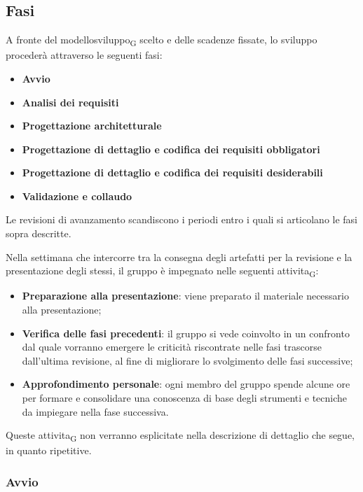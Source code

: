 \subsection{Fasi}

A fronte del \gls{modellosviluppo}\textsubscript{G} scelto e delle scadenze fissate, lo sviluppo procederà attraverso le seguenti fasi:
\begin{itemize}
	\item \textbf{Avvio}
	\item \textbf{Analisi dei requisiti}
	\item \textbf{Progettazione architetturale}
	\item \textbf{Progettazione di dettaglio e codifica dei requisiti obbligatori}
	\item \textbf{Progettazione di dettaglio e codifica dei requisiti desiderabili}
	\item \textbf{Validazione e collaudo}
\end{itemize}

Le revisioni di avanzamento scandiscono i periodi entro i quali si articolano le fasi sopra descritte.

Nella settimana che intercorre tra la consegna degli artefatti per la revisione e la presentazione degli stessi, il gruppo è impegnato nelle seguenti \gls{attivita}\textsubscript{G}: 
\begin{itemize}
	\item \textbf{Preparazione alla presentazione}: viene preparato il materiale necessario alla presentazione;
	\item \textbf{Verifica delle fasi precedenti}: il gruppo si vede coinvolto in un confronto dal quale vorranno emergere le criticità riscontrate nelle fasi trascorse dall'ultima revisione, al fine di migliorare lo svolgimento delle fasi successive;
	\item \textbf{Approfondimento personale}: ogni membro del gruppo spende alcune ore per formare e consolidare una conoscenza di base degli strumenti e tecniche da impiegare nella fase successiva.
\end{itemize}
Queste \gls{attivita}\textsubscript{G} non verranno esplicitate nella descrizione di dettaglio che segue, in quanto ripetitive.



\subsubsection{Avvio}

